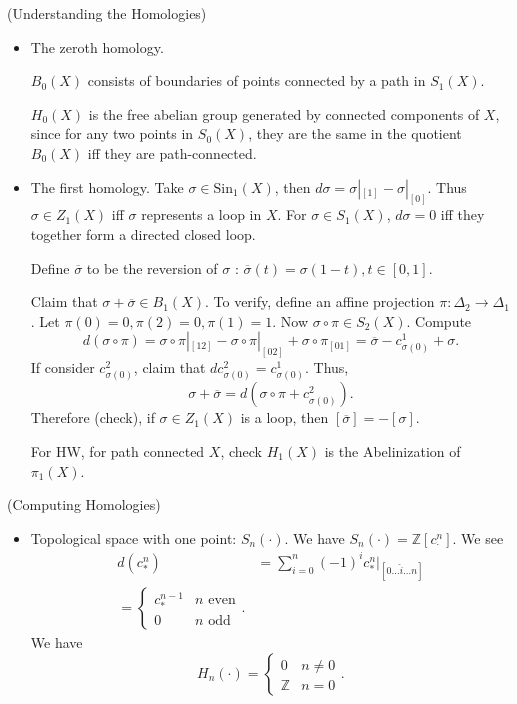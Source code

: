 \begin{example}(Understanding the Homologies)
	
	\begin{itemize}
		\item The zeroth homology.

$B_0(X)$ consists of boundaries of points connected by a path in $S_1(X)$.

$H_0(X)$ is the free abelian group generated by connected components of $X$, since for any two points in $S_0(X)$, they are the same in the quotient $B_0(X)$ iff they are path-connected.


	\item The first homology. 
		Take $\sigma \in \text{Sin}_1(X)$, then $d \sigma = \sigma|_{[1]} - \sigma|_{[0]}$. Thus $\sigma \in Z_1(X)$ iff $\sigma$ represents a loop in $X$. For $\sigma \in S_1(X)$, $d \sigma = 0$ iff they together form a directed closed loop. 

		Define $\overline{\sigma} $ to be the reversion of $\sigma$ : $\overline{\sigma} (t) = \sigma(1 - t), t \in [0,1]$. 

		Claim that $\sigma + \overline{\sigma} \in B_1(X)$. To verify, define an affine projection $\pi: \Delta_2 \to \Delta_1$. Let $\pi(0) = 0, \pi(2) = 0, \pi(1) = 1$. Now $\sigma \circ \pi \in S_2(X)$. Compute
		\[
			d(\sigma \circ \pi)
			= \sigma \circ \pi|_{[1 2]} - \sigma \circ \pi |_{[0 2]} + \sigma \circ \pi _{[0 1]}
			= \overline{\sigma}  - c^1_{\sigma(0)} + \sigma
		.\] 
		If consider $c^2_{\sigma(0)}$, claim that  $d c^2_{\sigma(0)} = c^1_{\sigma(0)}$.
		Thus,
		\[
			\sigma + \overline{\sigma} = d\left( \sigma \circ \pi + c^2_{\sigma(0)} \right) 
		.\] 
		Therefore (check), if $\sigma \in Z_1(X)$ is a loop, then $[\overline{\sigma} ] = - [\sigma]$.

		For HW, for path connected $X$, check $H_1(X)$ is the Abelinization of $\pi_1(X)$.
	\end{itemize}
\end{example}

\begin{example}(Computing Homologies)
	
	\begin{itemize}
		\item Topological space with one point: $S_n(\cdot )$. We have $S_n(\cdot ) = \mathbb{Z} [c_\cdot ^n]$. We see
\begin{align*}
	d(c_*^n) &= \sum_{i = 0}^n (-1)^i c_*^n |_{[0 \ldots \hat{i}  \ldots n]}\\
	= \begin{cases}
		c_*^{n - 1}  & n \text{ even}\\
		0 & n \text{ odd}
	\end{cases}
.\end{align*}
We have
\[
	H_n(\cdot ) = \begin{cases}
		0 & n \neq 0 \\
		\mathbb{Z} & n = 0
	\end{cases}
.\] 
	\end{itemize}
\end{example}

